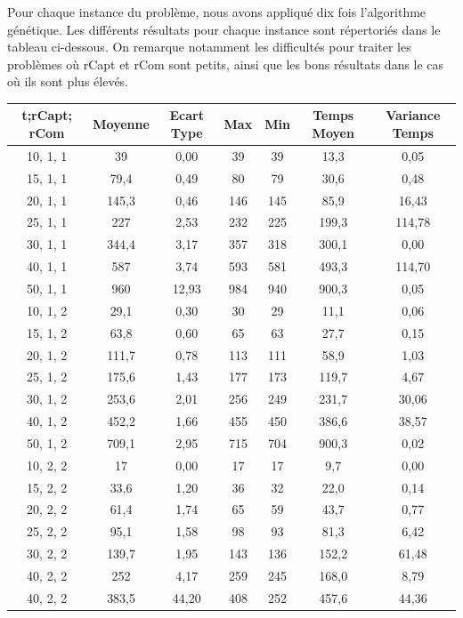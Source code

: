 \documentclass[12pt,a4paper]{article}
\begin{document}
Pour chaque instance du problème, nous avons appliqué dix fois l'algorithme génétique. Les différents résultats pour chaque instance sont répertoriés dans le tableau ci-dessous. On remarque notamment les difficultés pour traiter les problèmes où rCapt et rCom sont petits, ainsi que les bons résultats dans le cas où ils sont plus élevés. 
\begin{center}
\begin{tabular}{|c|c|c|c|c|c|c|}
\hline
t;rCapt; rCom & Moyenne & Ecart Type & Max & Min & Temps Moyen & Variance Temps\\
\hline
10, 1, 1	&	39	&	0,00	&	39	&	39	&	13,3	&	0,05	\\
\hline
15, 1, 1	&	79,4	&	0,49	&	80	&	79	&	30,6	&	0,48	\\
\hline
20, 1, 1 	&	145,3	&	0,46	&	146	&	145	&	85,9	&	16,43	\\
\hline
25, 1, 1	&	227	&	2,53	&	232	&	225	&	199,3	&	114,78	\\
\hline
30, 1, 1	&	344,4	&	3,17	&	357	&	318	&	300,1	&	0,00	\\
\hline
40, 1, 1	&	587	&	3,74	&	593	&	581	&	493,3	&	114,70	\\
\hline
50, 1, 1	&	960	&	12,93	&	984	&	940	&	900,3	&	0,05	\\
\hline
10, 1, 2	&	29,1	&	0,30	&	30	&	29	&	11,1	&	0,06	\\
\hline
15, 1, 2	&	63,8	&	0,60	&	65	&	63	&	27,7	&	0,15	\\
\hline
20, 1, 2	&	111,7	&	0,78	&	113	&	111	&	58,9	&	1,03	\\
\hline
25, 1, 2	&	175,6	&	1,43	&	177	&	173	&	119,7	&	4,67	\\
\hline
30, 1, 2	&	253,6	&	2,01	&	256	&	249	&	231,7	&	30,06	\\
\hline
40, 1, 2	&	452,2	&	1,66	&	455	&	450	&	386,6	&	38,57	\\
\hline
50, 1, 2	&	709,1	&	2,95	&	715	&	704	&	900,3	&	0,02	\\
\hline
10, 2, 2	&	17	&	0,00	&	17	&	17	&	9,7	&	0,00	\\
\hline
15, 2, 2	&	33,6	&	1,20	&	36	&	32	&	22,0	&	0,14	\\
\hline
20, 2, 2 	&	61,4	&	1,74	&	65	&	59	&	43,7	&	0,77	\\
\hline
25, 2, 2	&	95,1	&	1,58	&	98	&	93	&	81,3	&	6,42	\\
\hline
30, 2, 2	&	139,7	&	1,95	&	143	&	136	&	152,2	&	61,48	\\
\hline
40, 2, 2	&	252	&	4,17	&	259	&	245	&	168,0	&	8,79	\\
\hline
40, 2, 2	&	383,5	&	44,20	&	408	&	252	&	457,6	&	44,36	\\

\end{tabular}
\end{center}
\end{document}
